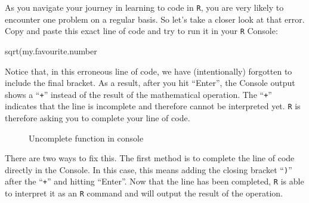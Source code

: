 \documentclass[
  letterpaper,
  DIV=11,
  numbers=noendperiod,
  oneside]{scrreprt}
\newenvironment{Shaded}{\begin{snugshade}}{\end{snugshade}}
\newcommand{\FunctionTok}[1]{\textcolor[rgb]{0.28,0.35,0.67}{#1}}
\newcommand{\NormalTok}[1]{\textcolor[rgb]{0.00,0.23,0.31}{#1}}
\begin{document}
As you navigate your journey in learning to code in \texttt{R}, you are
very likely to encounter one problem on a regular basis. So let's take a
closer look at that error. Copy and paste this exact line of code and
try to run it in your \texttt{R} Console:

\begin{Shaded}
\begin{Highlighting}[]
\FunctionTok{sqrt}\NormalTok{(my.favourite.number}
\end{Highlighting}
\end{Shaded}

Notice that, in this erroneous line of code, we have (intentionally)
forgotten to include the final bracket. As a result, after you hit
``Enter'', the Console output shows a ``\texttt{+}'' instead of the
result of the mathematical operation. The ``\texttt{+}'' indicates that
the line is incomplete and therefore cannot be interpreted yet.
\texttt{R} is therefore asking you to complete your line of code.

\begin{figure}


\caption{\label{fig-ConsoleUncompleteFunction}Uncomplete function in
console}

\end{figure}%

There are two ways to fix this. The first method is to complete the line
of code directly in the Console. In this case, this means adding the
closing bracket ``\texttt{)}'' after the ``\texttt{+}'' and hitting
``Enter''. Now that the line has been completed, \texttt{R} is able to
interpret it as an \texttt{R} command and will output the result of the
operation.
\end{document}

